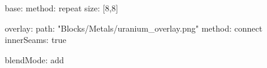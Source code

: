 base:
  method: repeat
  size: [8,8]
  
overlay:
  path: "Blocks/Metals/uranium_overlay.png"
  method: connect
  innerSeams: true
  
blendMode: add